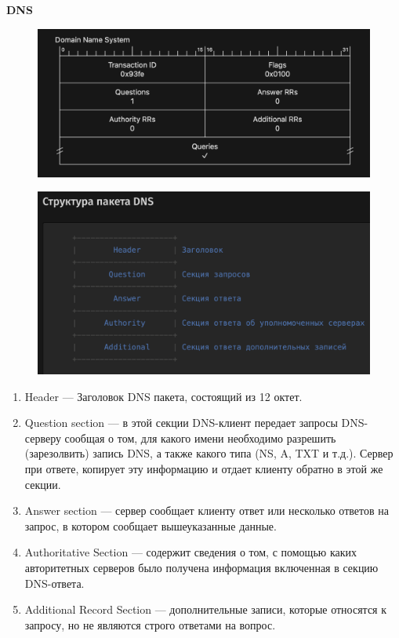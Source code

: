 \documentclass[12pt,onecolumn]{article}
\begin{document}
\textbf{DNS}
\begin{figure}[H]
    \centering
    \includegraphics*[width=\textwidth]{image/part10/dns.png}
\end{figure}
\begin{figure}[H]
    \centering
    \includegraphics*[width=\textwidth]{image/part10/dns-pack.png}
\end{figure}
\begin{enumerate}
    \item Header — Заголовок DNS пакета, состоящий из 12 октет.
    \item Question section — в этой секции DNS-клиент передает запросы DNS-серверу сообщая о том, для какого имени необходимо разрешить (зарезолвить) запись DNS, а также какого типа (NS, A, TXT и т.д.). Сервер при ответе, копирует эту информацию и отдает клиенту обратно в этой же секции.
    \item Answer section — сервер сообщает клиенту ответ или несколько ответов на запрос, в котором сообщает вышеуказанные данные.
    \item Authoritative Section — содержит сведения о том, с помощью каких авторитетных серверов было получена информация включенная в секцию DNS-ответа.
    \item Additional Record Section — дополнительные записи, которые относятся к запросу, но не являются строго ответами на вопрос.
\end{enumerate}
\end{document}

